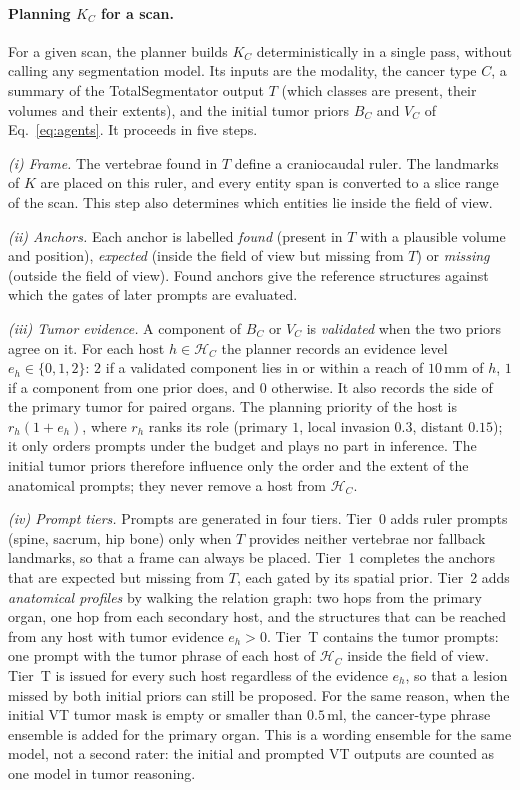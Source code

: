 \documentclass[fleqn,10pt]{olplainarticle}
\begin{document}
\paragraph{Planning $K_C$ for a scan.}
For a given scan, the planner builds $K_C$ deterministically in a single pass, without calling any segmentation model.
Its inputs are the modality, the cancer type $C$, a summary of the TotalSegmentator output $T$ (which classes are
present, their volumes and their extents), and the initial tumor priors $B_C$ and $V_C$ of Eq.~\eqref{eq:agents}.
It proceeds in five steps.

\emph{(i) Frame.} The vertebrae found in $T$ define a craniocaudal ruler. The landmarks of $K$ are placed on this ruler,
and every entity span is converted to a slice range of the scan. This step also determines which entities lie inside the
field of view.

\emph{(ii) Anchors.} Each anchor is labelled \emph{found} (present in $T$ with a plausible volume and position),
\emph{expected} (inside the field of view but missing from $T$) or \emph{missing} (outside the field of view). Found
anchors give the reference structures against which the gates of later prompts are evaluated.

\emph{(iii) Tumor evidence.} A component of $B_C$ or $V_C$ is \emph{validated} when the two priors agree on it. For each
host $h\in\mathcal{H}_C$ the planner records an evidence level $e_h\in\{0,1,2\}$: $2$ if a validated component lies in
or within a reach of $10$\,mm of $h$, $1$ if a component from one prior does, and $0$ otherwise. It also records the
side of the primary tumor for paired organs. The planning priority of the host is $r_h(1+e_h)$, where $r_h$ ranks its role
(primary $1$, local invasion $0.3$, distant $0.15$); it only orders prompts under the budget and plays no part in
inference. The initial tumor priors therefore influence only the order and the extent of the anatomical
prompts; they never remove a host from $\mathcal{H}_C$.

\emph{(iv) Prompt tiers.} Prompts are generated in four tiers. Tier~0 adds ruler prompts (spine, sacrum, hip bone) only
when $T$ provides neither vertebrae nor fallback landmarks, so that a frame can always be placed. Tier~1 completes the anchors that are expected but missing from $T$, each gated by its
spatial prior. Tier~2 adds \emph{anatomical profiles} by walking the relation graph: two hops from the primary organ,
one hop from each secondary host, and the structures that can be reached from any host with tumor evidence
$e_h>0$. Tier~T contains the tumor prompts: one prompt with the tumor phrase of each host of $\mathcal{H}_C$ inside the
field of view. Tier~T is issued for every such host regardless of the evidence $e_h$, so that a lesion missed by both
initial priors can still be proposed. For the same reason, when the initial VT tumor mask is empty or smaller than
$0.5$\,ml, the cancer-type phrase ensemble is added for the primary organ. This is a wording ensemble for the same
model, not a second rater: the initial and prompted VT outputs are counted as one model in tumor reasoning.
\end{document}
